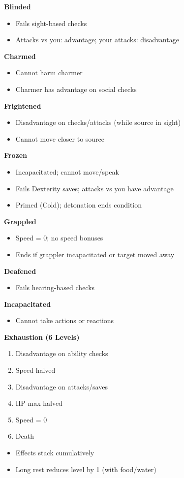 

\begin{scifitablebox}[screenbox,title=\textcolor{PanelGlow}{Conditions (Quick Reference)}]

\textbf{Blinded}
\begin{itemize}
\item Fails sight-based checks
\item Attacks vs you: advantage; your attacks: disadvantage
\end{itemize}

\textbf{Charmed}
\begin{itemize}
\item Cannot harm charmer
\item Charmer has advantage on social checks
\end{itemize}

\textbf{Frightened}
\begin{itemize}
\item Disadvantage on checks/attacks (while source in sight)
\item Cannot move closer to source
\end{itemize}

\textbf{Frozen}
\begin{itemize}
\item Incapacitated; cannot move/speak
\item Fails Dexterity saves; attacks vs you have advantage
\item Primed (Cold); detonation ends condition
\end{itemize}

\textbf{Grappled}
\begin{itemize}
\item Speed = 0; no speed bonuses
\item Ends if grappler incapacitated or target moved away
\end{itemize}

\textbf{Deafened}
\begin{itemize}
\item Fails hearing-based checks
\end{itemize}

\textbf{Incapacitated}
\begin{itemize}
\item Cannot take actions or reactions
\end{itemize}

\textbf{Exhaustion (6 Levels)}
\begin{enumerate}
\item Disadvantage on ability checks
\item Speed halved
\item Disadvantage on attacks/saves
\item HP max halved
\item Speed = 0
\item Death
\end{enumerate}
\begin{itemize}
\item Effects stack cumulatively
\item Long rest reduces level by 1 (with food/water)
\end{itemize}


\end{scifitablebox}

